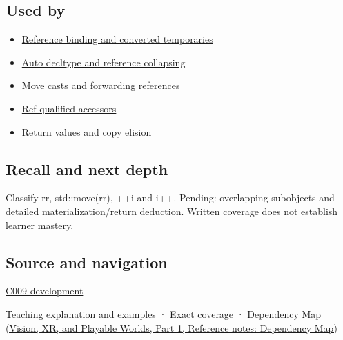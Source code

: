\subsection{Used by}\label{appendix-1121b30eaeb0-used-by}

\hypertarget{appendix-1121b30eaeb0-used-by}{}

\begin{itemize}
\tightlist
\item
  \hyperref[appendix-37856d997bb0]{Reference binding and converted temporaries}
\item
  \hyperref[appendix-5d4252a42886]{Auto decltype and reference collapsing}
\item
  \hyperref[appendix-0104b704fb11]{Move casts and forwarding references}
\item
  \hyperref[appendix-d42039b1d6f7]{Ref-qualified accessors}
\item
  \hyperref[appendix-b08d3788c5c6]{Return values and copy elision}
\end{itemize}

\subsection{Recall and next depth}\label{appendix-1121b30eaeb0-recall-and-next-depth}

\hypertarget{appendix-1121b30eaeb0-recall-and-next-depth}{}

Classify rr, std::move(rr), ++i and i++. Pending: overlapping subobjects and detailed materialization/return deduction. Written coverage does not establish learner mastery.

\subsection{Source and navigation}\label{appendix-1121b30eaeb0-source-and-navigation}

\hypertarget{appendix-1121b30eaeb0-source-and-navigation}{}

\hyperref[appendix-fd090d982a15-m009---parts-127-147]{C009 development}

\hyperref[01-foundations-i-ch003-an-expression-has-a-type-and-a-category]{Teaching explanation and examples} · \hyperref[appendix-fd090d982a15-m008---parts-113-126]{Exact coverage} · \href{../07-Vision-XR-and-Playable-Worlds-P01/main.pdf\#appendix-4ad47bdd269a}{Dependency Map (Vision, XR, and Playable Worlds, Part 1, Reference notes: Dependency Map)}
